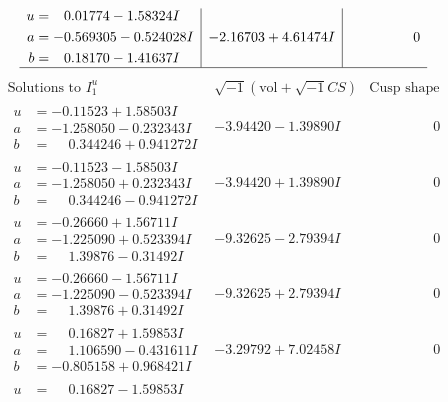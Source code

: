 \documentclass[1p]{elsarticle_modified}
\theoremstyle{definition}
\newcommand{\I}{\sqrt{-1}}
\begin{document}
$$\begin{array}{c|c|c}
\begin{aligned}
u &= \phantom{-}0.01774 - 1.58324 I \\
a &= -0.569305 - 0.524028 I \\
b &= \phantom{-}0.18170 - 1.41637 I\end{aligned}
 & -2.16703 + 4.61474 I & \phantom{-0.000000 } 0\\
 \hline 
 \end{array}$$\newpage$$\begin{array}{c|c|c}  
\text{Solutions to }I^u_{1}& \I (\text{vol} + \sqrt{-1}CS) & \text{Cusp shape}\\
 \hline 
\begin{aligned}
u &= -0.11523 + 1.58503 I \\
a &= -1.258050 - 0.232343 I \\
b &= \phantom{-}0.344246 + 0.941272 I\end{aligned}
 & -3.94420 - 1.39890 I & \phantom{-0.000000 } 0 \\ \hline\begin{aligned}
u &= -0.11523 - 1.58503 I \\
a &= -1.258050 + 0.232343 I \\
b &= \phantom{-}0.344246 - 0.941272 I\end{aligned}
 & -3.94420 + 1.39890 I & \phantom{-0.000000 } 0 \\ \hline\begin{aligned}
u &= -0.26660 + 1.56711 I \\
a &= -1.225090 + 0.523394 I \\
b &= \phantom{-}1.39876 - 0.31492 I\end{aligned}
 & -9.32625 - 2.79394 I & \phantom{-0.000000 } 0 \\ \hline\begin{aligned}
u &= -0.26660 - 1.56711 I \\
a &= -1.225090 - 0.523394 I \\
b &= \phantom{-}1.39876 + 0.31492 I\end{aligned}
 & -9.32625 + 2.79394 I & \phantom{-0.000000 } 0 \\ \hline\begin{aligned}
u &= \phantom{-}0.16827 + 1.59853 I \\
a &= \phantom{-}1.106590 - 0.431611 I \\
b &= -0.805158 + 0.968421 I\end{aligned}
 & -3.29792 + 7.02458 I & \phantom{-0.000000 } 0 \\ \hline\begin{aligned}
u &= \phantom{-}0.16827 - 1.59853 I \\

\end{aligned}
\end{array}$$
\end{document}
